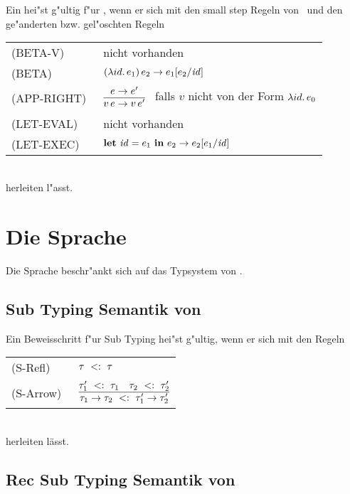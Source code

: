 Ein  hei"st g"ultig f"ur \LONECBN, wenn er sich mit den small step Regeln von \LONE\ 
und den ge"anderten bzw. gel"oschten Regeln\\[5mm]
  \begin{tabular}{ll}
     \mbox{(BETA-V)}      & nicht vorhanden \\[3mm]
     \mbox{(BETA)}        & $(\lambda id.\,e_1)\,e_2 \to e_1[e_2/{\text{\it id\/}}]$ \\[5mm]
     \mbox{(APP-RIGHT)\ } & $\regel{e \to e'}
                                   {v\,e \to v\,e'}$   \ 
                                   falls ${v}$ nicht von der Form $\lambda id.\,e_0$ \\[5mm]
     \mbox{(LET-EVAL)\  } & nicht vorhanden \\[3mm]
     \mbox{(LET-EXEC)}    & $\textbf{let}\ {\text{\it id\/}} = e_1\ \textbf{in}\ e_2 \to e_2[e_1/{\text{\it id\/}}]$
  \end{tabular}\\[7mm]
herleiten l"asst.

\section{Die Sprache \LONESUB}
Die Sprache \LONESUB beschr"ankt sich auf das Typsystem von \LONE. 

\subsection{Sub Typing Semantik von \LONESUB}

Ein Beweisschritt f"ur Sub Typing hei"st g"ultig, wenn er sich mit den Regeln  \\[5mm]
  \begin{tabular}{ll}
    \mbox{(S-Refl)\ }       & $\tau\ <:\ \tau$  \\[1mm]
    \mbox{(S-Arrow)\ }      & $\RULE{\subtype{\tau_1'} {\tau_1} \quad \subtype {\tau_2} {\tau_2'}}
                              {\subtype{\typeArrow{\tau_1}{\tau_2}} {\typeArrow{\tau_1'}{\tau_2'}}}$ \\[4mm]
  \end{tabular} \\[7mm]

herleiten l\"asst.

\subsection{Rec Sub Typing Semantik von \LONESUB}

